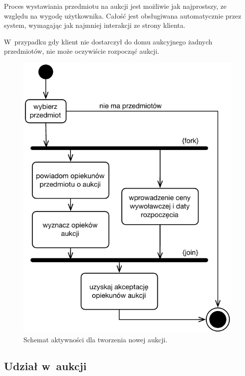 \documentclass[10pt,a4paper]{article}
\begin{document}
Proces wystawiania przedmiotu na aukcji jest możliwie jak najprostszy, ze
względu na wygodę użytkownika. Całość jest obsługiwana automatycznie przez
system, wymagając jak najmniej interakcji ze strony klienta.

W~przypadku gdy klient nie dostarczył do domu aukcyjnego żadnych przedmiotów,
nie może oczywiście rozpocząć aukcji.

\vspace{40pt}
\begin{figure}[hb]
  \begin{adjustwidth}{-3cm}{-3cm}
    \centering
    \includegraphics{figury/aktywnosc-nowa-aukcja}
    \caption{Schemat aktywności dla tworzenia nowej aukcji.}
    \label{fig:aktywnosc_nowa_aukcja}
  \end{adjustwidth}
\end{figure}
\clearpage

\subsection{Udział w~aukcji}
\end{document}

